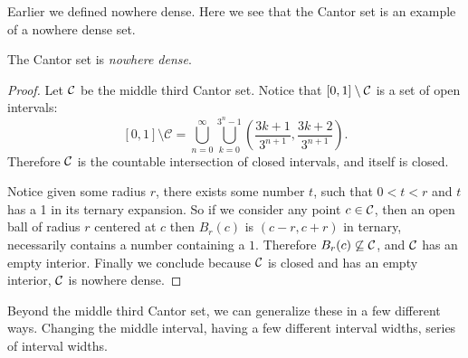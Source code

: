 Earlier we defined nowhere dense. Here we see that the Cantor set is an example of a nowhere dense set.  
\begin{claim}The Cantor set is \textit{nowhere dense}.  
\end{claim}  
\begin{proof}
    Let $\mathcal{C}$ be the middle third Cantor set.  Notice that $[0,1]\setminus \mathcal{C}$ is a set of open intervals: 
    $$ [0,1] \setminus \mathcal{C} =\bigcup_{n=0}^\infty\bigcup_{k=0}^{3^n-1}\left(\frac{3k+1}{3^{n+1}},\frac{3k+2}{3^{n+1}}\right). $$
    Therefore $\mathcal{C}$ is the countable intersection of closed intervals, and itself is closed.  
    
    Notice given some radius $r$, there exists some number $t$, such that $0<t<r$ and $t$ has a 1 in its ternary expansion.  So if we consider any point $c \in \mathcal{C}$, then an open ball of radius $r$ centered at $c$ then $B_r(c)$ is $(c-r, c+r)$ in ternary, necessarily contains a number containing a $1$.  Therefore $B_r(c) \not\subseteq \mathcal{C}$, and $\mathcal{C}$ has an empty interior.  Finally we conclude because $\mathcal{C}$ is closed and has an empty interior, $\mathcal{C}$ is nowhere dense.      
\end{proof}
Beyond the middle third Cantor set, we can generalize these in a few different ways.  Changing the middle interval, having a few different interval widths, series of interval widths. 

